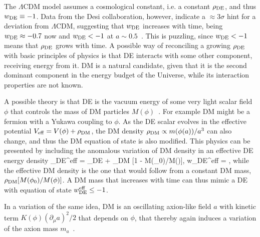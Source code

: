 The $\Lambda$CDM model assumes a cosmological constant, i.e. a constant $\rho_{\rm DE}$, and thus $w_{\rm DE} \equiv-1$.
Data from the {\sc Desi} collaboration, however, indicate a $\approx 3\sigma$ hint for a deviation from $\Lambda$CDM, suggesting that
$w_{\rm DE}$ increases with time, being $w_{\rm DE} \approx -0.7$ now and $w_{\rm DE}<-1$ at $a\sim 0.5$~\cite{DESIanomaly}.
This is puzzling, since $w_{\rm DE} <-1 $ means that $\rho_{\rm DE}$ grows with time.
A possible way of reconciling a growing $\rho_{\rm DE}$ with basic principles of physics is that DE
interacts with some other component, receiving energy from it.
DM is a natural candidate, given that it is the second dominant component in the energy budget of the Universe, while its interaction properties are not known. 

A possible theory is that DE is the vacuum energy of some very light scalar field $\phi$ that controls the mass of DM particles $M(\phi)$~\cite{DE2DM}.
For example DM might be a fermion with a Yukawa coupling to $\phi$.
As the DE scalar evolves in the effective potential $V_{\rm eff}=V(\phi) + \rho_{\rm DM}$, 
 the DM density $\rho_{\rm DM} \propto m(\phi(a))/a^3$ can also change,  and thus the DM equation of state is also modified.
This physics can be presented by including the anomalous variation of DM density in an effective DE energy density
\beq 
\rho_{\rm DE}^{\rm eff} = \rho_{\rm DE} + \rho_{\rm DM} [1 - M(\phi_0)/M(\phi)],\qquad\Rightarrow\qquad
w_{\rm DE}^{\rm eff} = ,
\eeq
while the effective DM density is the  one that would follow from a constant DM mass, $\rho_{\rm DM} [M(\phi_0)/M(\phi)]$.  A DM mass that increases with time can thus mimic a DE with equation of state 
$w_{\rm DE}^{\rm eff}  \leq -1$.

In a variation of the same idea, DM is an oscillating axion-like field $a$ with kinetic term $K(\phi)(\partial_\mu a)^2/2$ that depends on $\phi$, that thereby again induces a variation of the axion mass $m_a$~\cite{DE2DM}.



 
